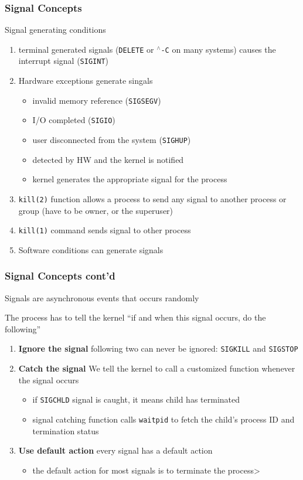 \documentclass[newPxFont,sthlmFooter,nooffset]{beamer}
\begin{document}
\begin{frame}[t]
  \frametitle{Signal Concepts}
Signal generating conditions
\begin{enumerate}
\item <1-> terminal generated signals (\texttt{DELETE} or \texttt{$^\wedge$-C} on many systems) causes the interrupt signal (\texttt{SIGINT})
\item <2-> Hardware exceptions generate singals
  \begin{itemize}
  \item <2-> invalid memory reference (\texttt{SIGSEGV})
  \item <2-> I/O completed (\texttt{SIGIO})
  \item <2-> user disconnected from the system (\texttt{SIGHUP})
  \item <2-> detected by HW and the kernel is notified
  \item <2-> kernel generates the appropriate signal for the process
  \end{itemize}
\item <3-> \texttt{kill(2)} function allows a process to send any signal to another process or group (have to be owner, or the superuser)
\item <4-> \texttt{kill(1)} command sends signal to other process
\item <5-> Software conditions can generate signals
\end{enumerate}

\end{frame}

\begin{frame}
  \frametitle{Signal Concepts cont'd}
Signals are asynchronous events that occurs randomly

The process has to tell the kernel ``if and when this signal occurs, do the following''

\begin{enumerate}
\item <2-> \textbf{Ignore the signal} following two can never be ignored: \texttt{SIGKILL} and \texttt{SIGSTOP}
\item <3-> \textbf{Catch the signal} We tell the kernel to call a customized function whenever the signal occurs
  \begin{itemize}
  \item <3-> if \texttt{SIGCHLD} signal is caught, it means child has terminated
  \item <3-> signal catching function calls \texttt{waitpid} to fetch the child's process ID and termination status
  \end{itemize}
\item <4-> \textbf{Use default action} every signal has a default action
  \begin{itemize}
  \item <4-> the default action for most signals is to terminate the process>
  \end{itemize}
\end{enumerate}

\end{frame}
\end{document}
